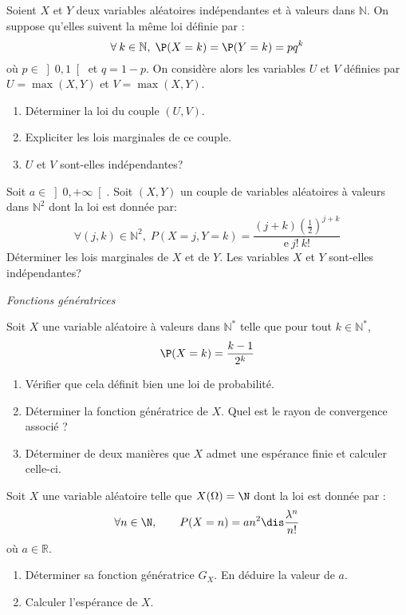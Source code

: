 \documentclass[a4paper,10pt]{report}
\begin{document}
\begin{Exercice}{} Soient $X$ et $Y$ deux variables aléatoires indépendantes et à valeurs dans $\mathbb{N}$. On suppose qu'elles suivent la même loi définie par :
$$\forall\:k\in\mathbb{N}, \; \P(X=k)=\P(Y=k)=pq^k$$
où $p \in \left] 0,1\right[$ et $q=1-p$. On considère alors les variables $U$ et $V$ définies par $U=\max(X,Y)$ et $V=\max(X,Y)$.
\begin{enumerate}
\item
Déterminer la loi du couple $(U,V)$.
\item
Expliciter les lois marginales de ce couple.
\item
$U$ et $V$ sont-elles indépendantes?
\end{enumerate}
\end{Exercice}


\begin{Exercice}{} Soit $a\in {\left] 0,+\infty\right[ }$. Soit $(X,Y)$ un couple de variables aléatoires à valeurs dans $\mathbb{N}^2$ dont la loi est donnée par: 
$$\forall (j,k)\in {\mathbb{N}^2}, \; P(X=j,Y=k)=\dfrac{(j+k)\left( \tfrac{1}{2}\right) ^{j+k}}{\mathrm{e}\:j!\:k!}$$
Déterminer les lois marginales de $X$ et de $Y$. Les variables $X$ et $Y$ sont-elles indépendantes?
\end{Exercice}

\newpage

\medskip

\begin{center}
\textit{{ {\large Fonctions génératrices}}}
\end{center}

\medskip

\begin{Exercice}{}  Soit $X$ une variable aléatoire à valeurs dans $\mathbb{N}^*$ telle que pour tout $k \in \mathbb{N}^*$,
$$ \P(X=k) = \dfrac{k-1}{2^k}$$

\begin{enumerate}
\item Vérifier que cela définit bien une loi de probabilité.
\item Déterminer la fonction génératrice de $X$. Quel est le rayon de convergence associé ?
\item Déterminer de deux manières que $X$ admet une espérance finie et calculer celle-ci.
\end{enumerate}
\end{Exercice}

\begin{Exercice}{} Soit $X$ une variable al\'eatoire telle que $X(\Omega)=\N$ dont la loi est donnée par :
$$\forall n\in\N,\qquad P(X=n)=an^2\dis\frac{\lambda^n}{n!}$$
où $a \in \mathbb{R}$.
\begin{enumerate}
	\item D\'eterminer sa fonction g\'en\'eratrice $G_X.$ En d\'eduire la valeur de $a.$
	
	\item Calculer l'esp\'erance de $X.$
\end{enumerate}
\end{Exercice}
\end{document}
